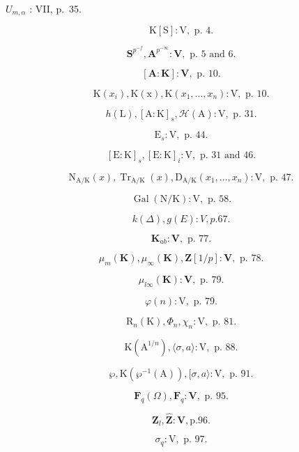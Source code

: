 \(U_{m,\alpha}\) : VII, p.~35.

\[
\mathrm{K} [ \mathrm{S} ]: \mathrm{V}, \text { p. } 4.
\]

\[
\mathbf {S} ^ {p ^ {- f}}, \mathbf {A} ^ {p ^ {- \infty}}: \mathbf {V}, \text { p. } 5 \text { and } 6.
\]

\[
[ \mathbf {A}: \mathbf {K} ]: \mathbf {V}, \text { p. } 10.
\]

\[
\mathrm{K} (x _ {i}), \mathrm{K} (\mathrm{x}), \mathrm{K} (x _ {1}, \dots , x _ {n}): \mathrm{V}, \text { p. } 10.
\]

\[
h (\mathrm{L}), [ \mathrm{A}: \mathrm{K} ] _ {s}, \mathscr {H} (\mathrm{A}): \mathrm{V}, \text { p. } 31.
\]

\[
\mathrm{E} _ {s}: \mathrm{V}, \text { p. } 44.
\]

\[
[ \mathrm{E}: \mathrm{K} ] _ {s}, [ \mathrm{E}: \mathrm{K} ] _ {i}: \mathrm{V}, \text { p. } 31 \text { and } 46.
\]

\[
\mathrm{N} _ {\mathrm{A} / \mathrm{K}} (x), \operatorname{Tr} _ {\mathrm{A} / \mathrm{K}} (x), \mathrm{D} _ {\mathrm{A} / \mathrm{K}} (x _ {1}, \dots , x _ {n}): \mathrm{V}, \text { p. } 47.
\]

\[
\operatorname{Gal} (\mathrm{N} / \mathrm{K}): \mathrm{V}, \text { p. } 58.
\]

\[
k (\Delta), g (E): V, p. 67.
\]

\[
\mathbf {K} _ {ab}: \mathbf {V}, \text { p. } 77.
\]

\[
\mu_ {m} (\mathbf {K}), \mu_ {\infty} (\mathbf {K}), \mathbf {Z} [ 1 / p ]: \mathbf {V}, \text {   p.   } 78.
\]

\[
\mu_ {l\infty} (\mathbf {K}): \mathbf {V}, \text { p. } 79.
\]

\[
\varphi (n): \mathrm{V}, \text { p. } 79.
\]

\[
\mathrm{R} _ {n} (\mathrm{K}), \Phi_ {n}, \chi_ {n}: \mathrm{V}, \text { p. } 81.
\]

\[
\mathrm{K} \left(\mathrm{A} ^ {1 / n}\right), \langle \sigma , a \rangle : \mathrm{V}, \text { p. } 88.
\]

\[
\wp , \mathrm{K} (\wp^ {- 1} (\mathrm{A})), [ \sigma , a \rangle : \mathrm{V}, \text { p. } 91.
\]

\[
\mathbf {F} _ {q} (\Omega), \mathbf {F} _ {q}: \mathbf {V}, \text { p. } 95.
\]

\[
\mathbf {Z} _ {l}, \hat {\mathbf {Z}}: \mathbf {V}, \mathrm{p.} 96.
\]

\[
\sigma_ {q}: \mathrm{V}, \text { p. } 97.
\]

